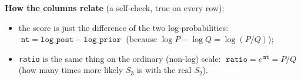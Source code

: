 \documentclass[11pt]{article}
\newcommand{\col}[1]{\texttt{#1}}
\begin{document}
\textbf{How the columns relate} (a self-check, true on every row):
\begin{itemize}\setlength{\itemsep}{1pt}
  \item the score is just the difference of the two log-probabilities:
        $\;\col{nt}=\col{log\_post}-\col{log\_prior}\;$ (because $\log P-\log Q=\log(P/Q)$);
  \item \col{ratio} is the same thing on the ordinary (non-log) scale:
        $\;\col{ratio}=e^{\,\col{nt}}=P/Q\;$ (how many times more likely $S_3$ is with the real $S_2$).
\end{itemize}
\end{document}
